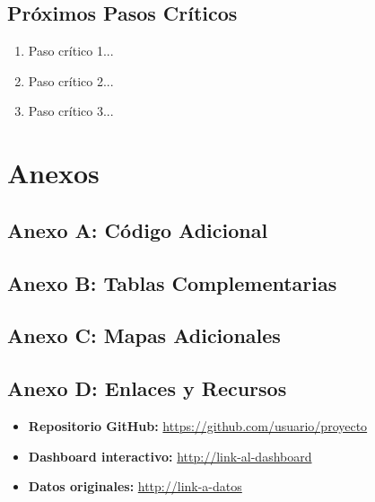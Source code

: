 \documentclass[11pt,letterpaper]{article}
\begin{document}
\subsection{Próximos Pasos Críticos}

\begin{enumerate}
    \item Paso crítico 1...
    \item Paso crítico 2...
    \item Paso crítico 3...
\end{enumerate}


\newpage
\printbibliography[heading=bibintoc,title={Referencias}]


\newpage
\appendix
\section{Anexos}

\subsection{Anexo A: Código Adicional}


\subsection{Anexo B: Tablas Complementarias}


\subsection{Anexo C: Mapas Adicionales}


\subsection{Anexo D: Enlaces y Recursos}

\begin{itemize}
    \item \textbf{Repositorio GitHub:} \url{https://github.com/usuario/proyecto}
    \item \textbf{Dashboard interactivo:} \url{http://link-al-dashboard}
    \item \textbf{Datos originales:} \url{http://link-a-datos}
\end{itemize}
\end{document}
